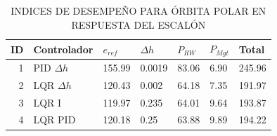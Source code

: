 
\begin{table}[!h]\label{table:step_polar}
	\caption{\MakeUppercase{Indices de desempeño para órbita polar en respuesta del escalón}}
	\centering
	\begin{tabular}{r|lllll|l}
		\multicolumn{1}{l|}{\textbf{ID}} & \textbf{Controlador}                  & \mbox{\boldmath$e_{ref}$}   & \mbox{\boldmath$\Delta h$} & \mbox{\boldmath$P_{RW}$}   & \mbox{\boldmath$P_{Mgt}$}    & \textbf{Total}      \\ 
		\hline
		1                       & PID $\Delta h$ & 155.99& 0.0019& 83.06 &6.90 &245.96  \\
		2                       & LQR $\Delta h$ & 120.43 & 0.002 & 64.18 &7.35 &191.97  \\
		3                       & LQR I          & 119.97& 0.235 &64.01 &9.64 &193.87  \\
		4                       & LQR PID        & 120.18 & 0.25 &63.88 &9.89 &194.22  \\
		\hline
	\end{tabular}
\end{table}
\clearpage

